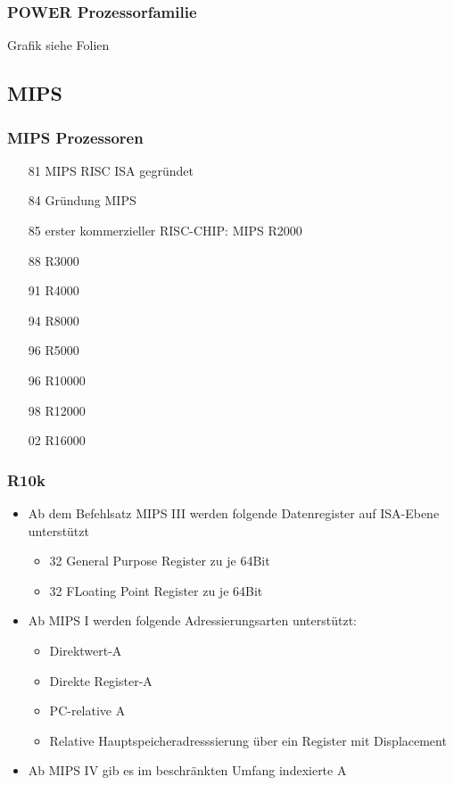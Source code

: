 \subsubsection{POWER Prozessorfamilie}
Grafik siehe Folien
\subsection{MIPS}
\subsubsection{MIPS Prozessoren}
\begin{itemize}
	\item[81] MIPS RISC ISA gegründet
	\item[84] Gründung MIPS
	\item[85] erster kommerzieller RISC-CHIP: MIPS R2000
	\item[88] R3000
	\item[91] R4000
	\item[94] R8000
	\item[96] R5000
	\item[96] R10000
	\item[98] R12000
	\item[02] R16000
\end{itemize}
\subsubsection{R10k}
\begin{itemize}
	\item Ab dem Befehlsatz MIPS III werden folgende Datenregister auf ISA-Ebene unterstützt
	\begin{itemize}
		\item 32 General Purpose Register zu je 64Bit
		\item 32 FLoating Point Register zu je 64Bit
	\end{itemize}
	\item Ab MIPS I werden folgende Adressierungsarten unterstützt:
	\begin{itemize}
		\item Direktwert-A
		\item Direkte Register-A
		\item PC-relative A
		\item Relative Hauptspeicheradresssierung über ein Register mit Displacement
	\end{itemize}
	\item Ab MIPS IV gib es im beschränkten Umfang indexierte A
\end{itemize}
